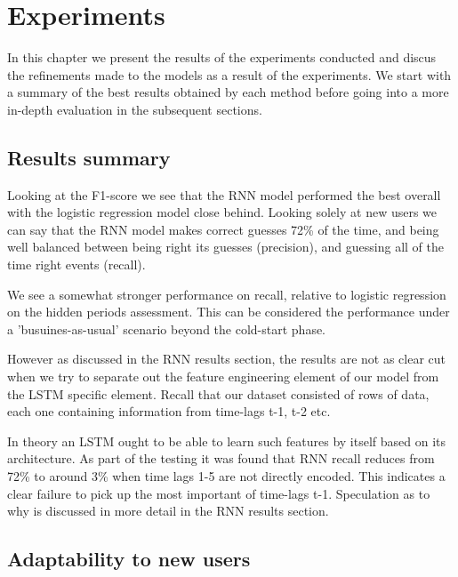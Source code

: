 
\chapter{Experiments} %

\label{Chapter5} %

In this chapter we present the results of the experiments conducted and discus the refinements made to the models as a result of the experiments. We start with a summary of the best results obtained by each method before going into a more in-depth evaluation in the subsequent sections.

\section{Results summary}

Looking at the F1-score we see that the RNN model performed the best overall with the logistic regression model close behind. Looking solely at new users we can say that the RNN model makes correct guesses 72\% of the time, and being well balanced between being right its guesses (precision), and guessing all of the time right events (recall). 

We see a somewhat stronger performance on recall, relative to logistic regression on the hidden periods assessment. This can be considered the performance under a 'busuines-as-usual' scenario beyond the cold-start phase. 

However as discussed in the RNN results section, the results are not as clear cut when we try to separate out the feature engineering element of our model from the LSTM specific element. Recall that our dataset consisted of rows of data, each one containing information from time-lags t-1, t-2 etc.

In theory an LSTM ought to be able to learn such features by itself based on its architecture. As part of the testing it was found that RNN recall reduces from 72\% to around 3\% when time lags 1-5 are not directly encoded. This indicates a clear failure to pick up the most important of time-lags t-1. Speculation as to why is discussed in more detail in the RNN results section.

\section{Adaptability to new users}


